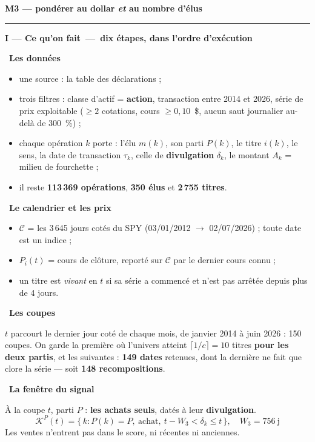 \documentclass[9pt,a4paper]{extarticle}
\newcommand{\mouv}[2]{\vspace{1.7mm}{\color{bleu}\hrule height 1pt}\vspace{0.8mm}%
  {\color{bleu}\bfseries #1~---~#2}\par\vspace{0.5mm}{\color{bleu!35}\hrule height 0.5pt}\vspace{1.1mm}}
\newcommand{\etape}[2]{\vspace{0.9mm}{\color{rouge}\bfseries #1.}~{\bfseries #2}\par\vspace{0.15mm}}
\newenvironment{pts}{\begin{itemize}[leftmargin=3.4mm,itemsep=0.2mm,topsep=0.4mm,parsep=0pt,label={\color{bleu}\footnotesize\textbullet}]}{\end{itemize}}
\begin{document}
\begin{center}
{\large\bfseries M3 --- pondérer au dollar \emph{et} au nombre d'élus}
\end{center}
\vspace{0.4mm}\hrule\vspace{1.2mm}

\begin{multicols}{2}

\mouv{I --- Ce qu'on fait}{dix étapes, dans l'ordre d'exécution}

\etape{1}{Les données}
\begin{pts}
\item une source : la table des déclarations ;
\item trois filtres : classe d'actif = \textbf{action}, transaction entre 2014 et 2026, série de prix
      exploitable ($\ge 2$ cotations, cours $\ge 0{,}10$~\$, aucun saut journalier au-delà de 300~\%) ;
\item chaque opération $k$ porte : l'élu $m(k)$, son parti $P(k)$, le titre $i(k)$, le sens, la date de
      transaction $\tau_k$, celle de \textbf{divulgation} $\delta_k$, le montant $A_k$ = milieu de fourchette ;
\item il reste \textbf{113\,369 opérations}, \textbf{350 élus} et \textbf{2\,755 titres}.
\end{pts}

\etape{2}{Le calendrier et les prix}
\begin{pts}
\item $\mathcal C$ = les 3\,645 jours cotés du SPY (03/01/2012 $\to$ 02/07/2026) ; toute date est un indice ;
\item $P_i(t)$ = cours de clôture, reporté sur $\mathcal C$ par le dernier cours connu ;
\item un titre est \emph{vivant} en $t$ si sa série a commencé et n'est pas arrêtée depuis plus de 4 jours.
\end{pts}

\etape{3}{Les coupes}
$t$ parcourt le dernier jour coté de chaque mois, de janvier 2014 à juin 2026 : 150 coupes. On garde la
première où l'univers atteint $\lceil 1/c\rceil = 10$ titres \textbf{pour les deux partis}, et les suivantes :
\textbf{149 dates} retenues, dont la dernière ne fait que clore la série --- soit \textbf{148 recompositions}.

\etape{4}{La fenêtre du signal}
À la coupe $t$, parti $P$ : \textbf{les achats seuls}, datés à leur \textbf{divulgation}.
\[ \mathcal K^P(t) = \bigl\{\,k : P(k)=P,\ \text{achat},\ t - W_3 < \delta_k \le t \,\bigr\},
   \quad W_3 = 756\ \text{j} \]
Les ventes n'entrent pas dans le score, ni récentes ni anciennes.


\end{multicols}
\end{document}
